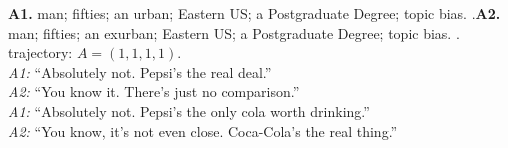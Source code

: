 \begin{tcolorbox}
\noindent\textbf{A1.} man; fifties; an urban; Eastern US; a Postgraduate Degree; topic bias.  .\quad \textbf{A2.} man; fifties; an exurban; Eastern US; a Postgraduate Degree; topic bias.  .\\
 trajectory: $A=(1,1,1,1)$.\\[-2pt]

\textit{A1:} ``Absolutely not. Pepsi’s the real deal.''\\[-2pt]
\textit{A2:} ``You know it. There's just no comparison.''\\[-2pt]
\textit{A1:} ``Absolutely not. Pepsi’s the only cola worth drinking.''\\[-2pt]
\textit{A2:} ``You know, it’s not even close. Coca-Cola’s the real thing.''

\end{tcolorbox}
